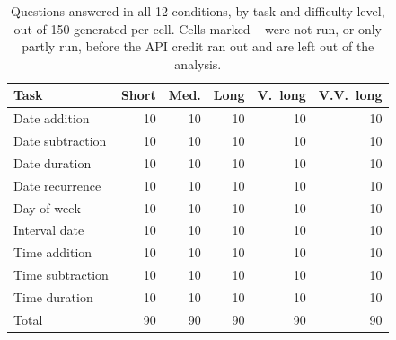 \begin{table}[t]
\centering
\small
\setlength{\tabcolsep}{3.5pt}
\begin{tabular}{@{}lrrrrr@{}}
\toprule
Task & Short & Med. & Long & V.\ long & V.V.\ long \\
\midrule
Date addition & 10 & 10 & 10 & 10 & 10 \\
Date subtraction & 10 & 10 & 10 & 10 & 10 \\
Date duration & 10 & 10 & 10 & 10 & 10 \\
Date recurrence & 10 & 10 & 10 & 10 & 10 \\
Day of week & 10 & 10 & 10 & 10 & 10 \\
Interval date & 10 & 10 & 10 & 10 & 10 \\
Time addition & 10 & 10 & 10 & 10 & 10 \\
Time subtraction & 10 & 10 & 10 & 10 & 10 \\
Time duration & 10 & 10 & 10 & 10 & 10 \\
\midrule
Total & 90 & 90 & 90 & 90 & 90 \\
\bottomrule
\end{tabular}
\caption{Questions answered in all 12 conditions, by task and difficulty level, out of 150 generated per cell. Cells marked -- were not run, or only partly run, before the API credit ran out and are left out of the analysis.}
\label{tab:coverage}
\end{table}
